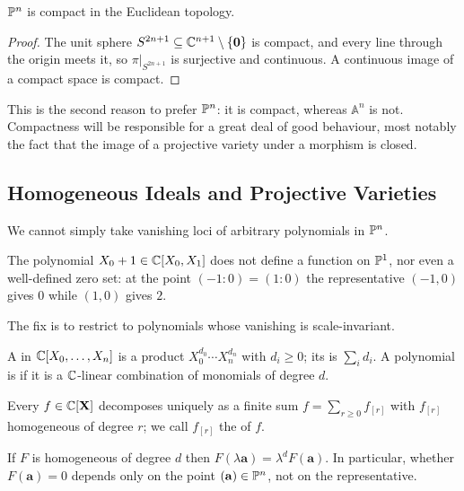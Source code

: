 \documentclass[a4paper]{scrartcl}
\newcommand{\A}{\mathbb{A}}
\begin{document}
\begin{proposition}
	$\mathbb{P}^n$ is compact in the Euclidean topology.
\end{proposition}

\begin{proof}
	The unit sphere $S^{2n+1} \subseteq \mathbb{C}^{n+1}\setminus\{\mathbf 0\}$ is compact, and every line through the origin meets it, so $\pi|_{S^{2n+1}}$ is surjective and continuous. A continuous image of a compact space is compact.
\end{proof}

This is the second reason to prefer $\mathbb{P}^n$: it is compact, whereas $\A^n$ is not. Compactness will be responsible for a great deal of good behaviour, most notably the fact that the image of a projective variety under a morphism is closed.

\subsection{Homogeneous Ideals and Projective Varieties}

We cannot simply take vanishing loci of arbitrary polynomials in $\mathbb{P}^n$.

\begin{example}
	The polynomial $X_0 + 1 \in \mathbb{C}[X_0,X_1]$ does not define a function on $\mathbb{P}^1$, nor even a well-defined zero set: at the point $(-1:0) = (1:0)$ the representative $(-1,0)$ gives $0$ while $(1,0)$ gives $2$.
\end{example}

The fix is to restrict to polynomials whose vanishing is scale-invariant.

\begin{definition}
	A  in $\mathbb{C}[X_0,\dots,X_n]$ is a product $X_0^{d_0}\cdots X_n^{d_n}$ with $d_i \geq 0$; its  is $\sum_i d_i$. A polynomial is  if it is a $\mathbb{C}$-linear combination of monomials of degree $d$.
\end{definition}

Every $f \in \mathbb{C}[\mathbf X]$ decomposes uniquely as a finite sum $f = \sum_{r \geq 0} f_{[r]}$ with $f_{[r]}$ homogeneous of degree $r$; we call $f_{[r]}$ the  of $f$.

\begin{lemma}
	If $F$ is homogeneous of degree $d$ then $F(\lambda \mathbf{a}) = \lambda^d F(\mathbf a)$. In particular, whether $F(\mathbf a) = 0$ depends only on the point $(\mathbf a) \in \mathbb{P}^n$, not on the representative.
\end{lemma}
\end{document}
